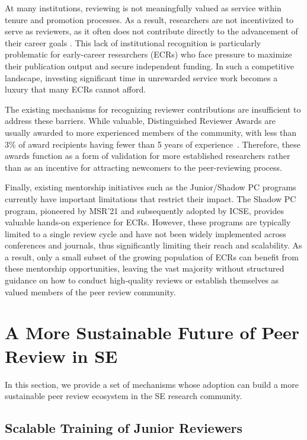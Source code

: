 \documentclass[sigconf]{acmart}
\begin{document}
At many institutions, reviewing is not meaningfully valued as service within tenure and promotion processes. As a result, researchers are not incentivized to serve as reviewers, as it often does not contribute directly to the advancement of their career goals \cite{Ernst2021}. This lack of institutional recognition is particularly problematic for early-career researchers (ECRs) who face pressure to maximize their publication output and secure independent funding. In such a competitive landscape, investing significant time in unrewarded service work becomes a luxury that many ECRs cannot afford. 

The existing mechanisms for recognizing reviewer contributions are insufficient to address these barriers. While valuable, Distinguished Reviewer Awards are usually awarded to more experienced members of the community, with less than 3\% of award recipients having fewer than 5 years of experience~\cite{Ernst2021}. Therefore, these awards function as a form of validation for more established researchers rather than as an incentive for attracting newcomers to the peer-reviewing process. 

Finally, existing mentorship initiatives such as the Junior/Shadow PC programs currently have important limitations that restrict their impact. The Shadow PC program, pioneered by MSR'21 and subsequently adopted by ICSE, provides valuable hands-on experience for ECRs. However, these programs are typically limited to a single review cycle and have not been widely implemented across conferences and journals, thus significantly limiting their reach and scalability. As a result, only a small subset of the growing population of ECRs can benefit from these mentorship opportunities, leaving the vast majority without structured guidance on how to conduct high-quality reviews or establish themselves as valued members of the peer review community.

\section{A More Sustainable Future of Peer Review in SE}

In this section, we provide a set of mechanisms whose adoption can build a more sustainable peer review ecosystem in the SE research community.

\subsection{Scalable Training of Junior Reviewers}
\end{document}
